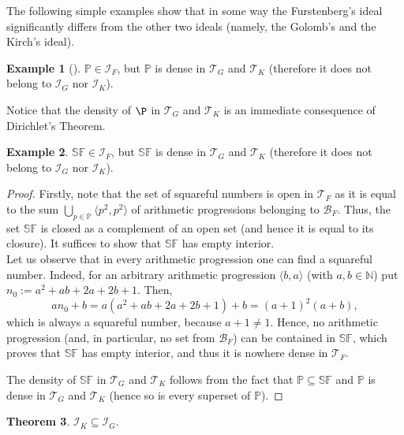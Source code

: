 \documentclass{amsart}
\newtheorem{thm}{Theorem}[section]
\theoremstyle{definition}
\newtheorem{ex}[thm]{Example}
\newcommand{\N}{{\mathbb N}}
\newcommand{\I}{\mathcal I}
\newcommand{\T}{\mathcal{T}}
\newcommand{\B}{\mathcal{B}}
\newcommand{\SqrFr}{\mathbb{SF}}
\newcommand{\arithseq}[2]{\langle#2, #1\rangle}
\begin{document}
The following simple examples show that in some way the Furstenberg's ideal significantly differs from the other two ideals (namely, the Golomb's and the Kirch's ideal).

\begin{ex}[{\cite[Section 5]{Szczuka4}}] \label{primes}
$\mathbb{P}\in \I_F$, but $\mathbb{P}$ is dense in $\T_G$ and $\T_K$ (therefore it does not belong to $\I_G$ nor $\I_K$).
\end{ex}

Notice that the density of $\P$ in $\T_G$ and $\T_K$ is an immediate consequence of Dirichlet's Theorem.

\begin{ex}\label{exSqrFr} 
$\SqrFr\in \I_F$, but $\SqrFr$ is dense in $\T_G$ and $\T_K$ (therefore it does not belong to $\I_G$ nor $\I_K$).
\end{ex}

\begin{proof}
Firstly, note that the set of squareful numbers is open in $\T_F$ as it is equal to the sum $\bigcup_{p\in\mathbb{P}}{\arithseq{p^2}{p^2}}$ of arithmetic progressions belonging to $\B_F$. Thus, the set $\SqrFr$ is closed as a complement of an open set (and hence it is equal to its closure). It suffices to show that $\SqrFr$ has empty interior.\\
Let us observe that in every arithmetic progression one can find a squareful number. Indeed, for an arbitrary arithmetic progression $\arithseq{a}{b}$ (with $a,b\in\N$) put $n_0 := a^2 +ab+2a+2b+1$. 
Then,
$$an_0 +b = a(a^2 +ab+2a+2b+1)+b = (a+1)^2 (a+b),$$
which is always a squareful number, because $a+1  \neq 1$. Hence, no arithmetic progression (and, in particular, no set from $\B_F$) can be contained in $\SqrFr$, which proves that $\SqrFr$ has empty interior, and thus it is nowhere dense in $\T_F$.

The density of $\SqrFr$ in $\T_G$ and $\T_K$ follows from the fact that $\mathbb{P}\subseteq \SqrFr$ and $\mathbb{P}$ is dense in $\T_G$ and $\T_K$ (hence so is every superset of $\mathbb{P}$).
\end{proof}

\begin{thm}
$\I_K \subseteq \I_G$.
\end{thm}
\end{document}
